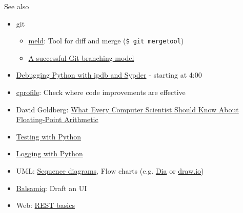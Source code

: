 \documentclass{beamer}
\begin{document}
\begin{frame}{See also}
    \begin{itemize}
        \item git
        \begin{itemize}
            \item \href{http://meldmerge.org/}{meld}: Tool for diff and merge (\texttt{\$ git mergetool})
            \item \href{https://nvie.com/posts/a-successful-git-branching-model/}{A successful Git branching model}
        \end{itemize}
        \item \href{https://www.youtube.com/watch?v=8SNaW1nt6j0}{Debugging Python with ipdb and Sypder} - starting at 4:00
        \item \href{https://docs.python.org/3/library/profile.html}{cprofile}: Check where code improvements are effective
        \item David Goldberg: \href{https://www.itu.dk/~sestoft/bachelor/IEEE754_article.pdf}{What Every Computer Scientist Should Know About Floating-Point Arithmetic}
        \item \href{https://martin-thoma.com/testing-python-code/}{Testing with Python}
        \item \href{https://martin-thoma.com/logging-in-python/}{Logging with Python}
        \item UML: \href{https://www.websequencediagrams.com/}{Sequence diagrams}, Flow charts (e.g. \href{https://wiki.gnome.org/Apps/Dia/}{Dia} or \href{https://www.draw.io/}{draw.io})
        \item \href{https://balsamiq.com/}{Balsamiq}: Draft an UI
        \item Web: \href{https://gist.github.com/alexserver/2fcc26f7e1ebcfc9f6d8}{REST basics}
    \end{itemize}
\end{frame}
\end{document}
